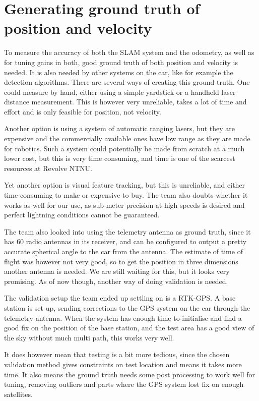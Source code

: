 \section{Generating ground truth of position and velocity}

To measure the accuracy of both the \gls{SLAM} system and the odometry, as well as for tuning gains in both, good ground truth of both position and velocity is needed. It is also needed by other systems on the car, like for example the detection algorithms. There are several ways of creating this ground truth. One could measure by hand, either using a simple yardstick or a handheld laser distance measurement. This is however very unreliable, takes a lot of time and effort and is only feasible for position, not velocity.

Another option is using a system of automatic ranging lasers, but they are expensive and the commercially available ones have low range as they are made for robotics. Such a system could potentially be made from scratch at a much lower cost, but this is very time consuming, and time is one of the scarcest resources at Revolve NTNU. 

Yet another option is visual feature tracking, but this is unreliable, and either time-consuming to make or expensive to buy. The team also doubts whether it works as well for our use, as sub-meter precision at high speeds is desired and perfect lightning conditions cannot be guaranteed. 

The team also looked into using the telemetry antenna as ground truth, since it has $60$ radio antennas in its receiver, and can be configured to output a pretty accurate spherical angle to the car from the antenna. The estimate of time of flight was however not very good, so to get the position in three dimensions another antenna is needed. We are still waiting for this, but it looks very promising. As of now though, another way of doing validation is needed. 

The validation setup the team ended up settling on is a \gls{RTK-GPS}. A base station is set up, sending corrections to the \gls{GPS} system on the car through the telemetry antenna. When the system has enough time to initialise and find a good fix on the position of the base station, and the test area has a good view of the sky without much multi path, this works very well. 

It does however mean that testing is a bit more tedious, since the chosen validation method gives constraints on test location and means it takes more time. It also means the ground truth needs some post processing to work well for tuning, removing outliers and parts where the \gls{GPS} system lost fix on enough satellites.
